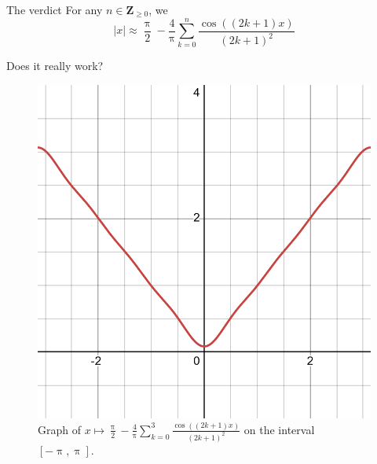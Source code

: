 \documentclass[portrait,fleqn,12pt]{beamer}
\newcommand{\integers}{\mathbf{Z}}
\begin{document}
\begin{frame}{The verdict}
  For any $n \in \integers_{\geq 0}$, we
  \begin{equation}
    |x| \approx \frac{\uppi}{2} 
       - \frac{4}{\uppi}
         \sum_{k=0}^n \frac{\cos((2 k+1) x)}{(2k+1)^2}
  \end{equation}
\end{frame}

\begin{frame}{Does it really work?}
  \begin{center}
    \begin{figure}
  \includegraphics[scale=0.15]{desmos-graph(21).png}
  \caption{Graph of $x\mapsto \frac{\uppi}{2} 
  - \frac{4}{\uppi}
    \sum_{k=0}^3 \frac{\cos((2 k+1) x)}{(2k+1)^2}$
    on the interval $[-\uppi, \uppi]$.}
    \end{figure}
  \end{center}
\end{frame}
\end{document}
